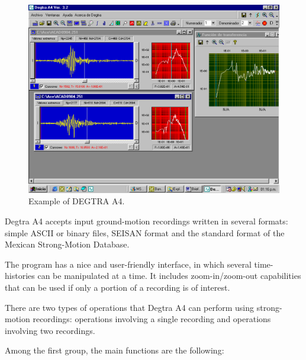 \begin{figure}
\centerline{\includegraphics[width=0.9\linewidth]{fig/fig36}}
\caption{Example of DEGTRA A4.}
\label{fig:degtra}
\end{figure}

Degtra A4 accepts input ground-motion recordings written in several formats: simple ASCII or binary files, SEISAN format and the standard format of the Mexican Strong-Motion Database. 

The program has a nice and user-friendly interface, in which several time-histories can be manipulated at a time. It includes zoom-in/zoom-out capabilities that can be used if only a portion of a recording is of interest. 

There are two types of operations that Degtra A4 can perform using strong-motion recordings: operations involving a single recording and operations involving two recordings. 

Among the first group, the main functions are the following: 

